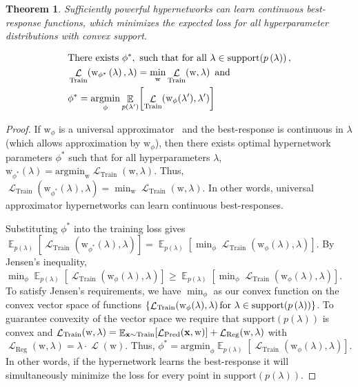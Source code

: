 \documentclass{article} %
\newcommand{\argmin}{\mathop{\mathrm{argmin}}\limits}
\newtheorem{theorem}{Theorem}[section]
\newcommand{\param}{\mathrm{w}} %
\newcommand{\hyper}{\lambda} %
\newcommand{\hyperHyper}{\hyper'} %
\newcommand{\innerOptParam}[1]{\param^{*} \! \left( #1 \right)} %
\newcommand{\lossSymbol}{\mathop{\mathcal{L}}} %
\newcommand{\lossSymbolInner}{\lossSymbol_{\mathrm{Train}}} %
\newcommand{\lossSymbolOuter}{\lossSymbol_{\mathrm{Valid.}}} %
\newcommand{\innerLoss}[2]{\lossSymbolInner \! \left( #1, #2 \right)} %
\newcommand{\outerLoss}[1]{\lossSymbolOuter \! \left( #1 \right)}%
\newcommand{\predictionLoss}[2]{\lossSymbol_{\mathrm{Pred}} ( #1, #2 )} %
\newcommand{\regLoss}[2]{\lossSymbol_{\mathrm{Reg}} ( #1, #2 )}%
\newcommand{\variableData}{\bf{x}} %
\newcommand{\ETrain}[1]{\mathop{\mathbb{E}}_{\variableData \sim \mathrm{Train}} \! \left[ #1 \right]}
\newcommand{\innerLossEExpand}[2]{\ETrain{\predictionLoss{\variableData}{#1}} + \regLoss{#1}{#2}} %
\newcommand{\responseParam}{\phi} %
\newcommand{\approxResponseSymbol}[1]{\param_{#1}} %
\newcommand{\approxResponse}[2]{\approxResponseSymbol{#2} ( #1 )} %
\newcommand{\argminTargetVary}{\responseParam}%
\newcommand{\argminTargetFix}{\responseParam}%
\newcommand{\approxResponseOutput}[1]{\approxResponseSymbol{\responseParam^{*}} ( #1 )}
\newcommand{\proofLoss}{\innerLoss{\approxResponse{\hyper}{\responseParam}}{\hyper}}
\newcommand{\proofTargetLossOutput}{\outerLoss{\approxResponseOutput{\hyper}}}
\newcommand{\targetLoss}{\outerLoss{\innerOptParam{\hyper}}}
\newcommand{\phyper}{p \left( \hyper \right)}
\newcommand{\hyperSupport}{\mathrm{support} \! \left( \phyper \right)} %
\newcommand{\hyperDomain}{\textnormal{for all } \hyper \in \hyperSupport}
\newcommand{\Ehyper}[1]{\mathop{\mathbb{E}}_{\phyper} \! \left[ #1 \right]}
\newcommand{\rename}[1]{#1'}
\newcommand{\EhyperFix}[1]{\mathop{\mathbb{E}}_{p \left( \rename{\hyper} \right)} \! \left[ #1 \right]}
\newcommand{\proofLossFix}{\innerLoss{\approxResponse{\rename{\hyper}}{\responseParam}}{\rename{\hyper}}}
\begin{document}
%
\begin{theorem}
\label{amoritizedExactness}
Sufficiently powerful hypernetworks can learn continuous best-response functions, which minimizes the expected loss for all hyperparameter distributions with convex support.

\begin{align*}
&\textnormal{There exists } \responseParam^{*}, \textnormal{ such that } \hyperDomain,\\
&\innerLoss{\param_{\responseParam^{*}} \left( \hyper \right)}{\hyper} = \min_{\param} \innerLoss{\param}{\hyper} \textnormal{ and}\\
&\responseParam^{*} = \argmin_{\argminTargetFix} \EhyperFix{\proofLossFix}
\end{align*}
\end{theorem}
%
\begin{proof}
If $\param_{\responseParam}$ is a universal approximator~\citep{hornik1991approximation} and the best-response is continuous in $\hyper$ (which allows approximation by $\param_{\responseParam}$), then there exists optimal hypernetwork parameters $\responseParam^{*}$ such that for all hyperparameters $\hyper$, $\param_{\responseParam^{*}} (\hyper) = \mathrm{argmin}_{\param} \innerLoss{\param}{\hyper}$.
Thus, $\innerLoss{\param_{\responseParam^{*}} \left( \hyper \right)}{\hyper} = \min_{\param} \innerLoss{\param}{\hyper}$.
In other words, universal approximator hypernetworks can learn continuous best-responses.

Substituting $\responseParam^{*}$ into the training loss gives ${\Ehyper{\innerLoss{\approxResponse{\hyper}{\responseParam^{*}}}{\hyper}} = \Ehyper{\min_{\argminTargetFix} \proofLoss}}$.
By Jensen's inequality, $\min_{\argminTargetFix} \Ehyper{\proofLoss} \geq \Ehyper{\min_{\argminTargetFix} \proofLoss}$.
To satisfy Jensen's requirements, we have $\min_{\argminTargetFix}$ as our convex function on the convex vector space of functions $\{\proofLoss \textnormal{for } \hyper \in \hyperSupport \}$.
To guarantee convexity of the vector space we require that $\hyperSupport$ is convex and $\innerLoss{\param}{\hyper} = \innerLossEExpand{\param}{\hyper}$ with $\regLoss{\param}{\hyper} = \hyper \cdot \lossSymbol ( \param)$.
Thus, $\responseParam^{*} = \mathrm{argmin}_{\argminTargetFix} \Ehyper{\proofLoss}$.
In other words, if the hypernetwork learns the best-response it will simultaneously minimize the loss for every point in $\hyperSupport$.
\end{proof}
\end{document}
